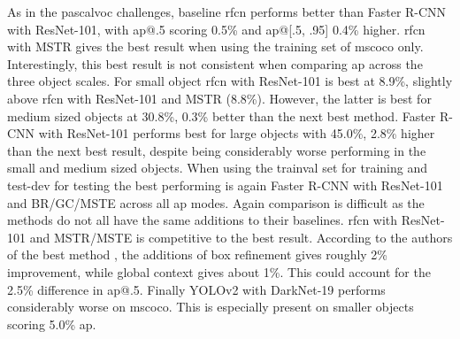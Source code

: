 As in the \gls{pascalvoc} challenges, baseline \gls{rfcn} performs better than Faster R-CNN with ResNet-101, with \gls{ap}@.5 scoring 0.5\% and \gls{ap}@[.5, .95] 0.4\% higher. \gls{rfcn} with MSTR gives the best result when using the training set of \gls{mscoco} only. Interestingly, this best result is not consistent when comparing \gls{ap} across the three object scales. For small object \gls{rfcn} with ResNet-101 is best at 8.9\%, slightly above \gls{rfcn} with ResNet-101 and MSTR (8.8\%). However, the latter is best for medium sized objects at 30.8\%, 0.3\% better than the next best method. Faster R-CNN with ResNet-101 performs best for large objects with 45.0\%, 2.8\% higher than the next best result, despite being considerably worse performing in the small and medium sized objects. When using the trainval set for training and test-dev for testing the best performing is again Faster R-CNN with ResNet-101 and BR/GC/MSTE across all \gls{ap} modes. Again comparison is difficult as the methods do not all have the same additions to their baselines. \gls{rfcn} with ResNet-101 and MSTR/MSTE is competitive to the best result. According to the authors of the best method \cite{deepres}, the additions of box refinement gives roughly 2\% improvement, while global context gives about 1\%. This could account for the 2.5\% difference in \gls{ap}@.5. Finally YOLOv2 with DarkNet-19 performs considerably worse on \gls{mscoco}. This is especially present on smaller objects scoring 5.0\% \gls{ap}.